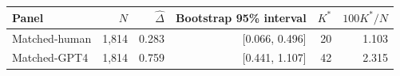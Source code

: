 \begin{tabular}{lrrrrr}
\toprule
Panel & $N$ & $\widehat\Delta$ & Bootstrap 95\% interval & $K^*$ & $100K^*/N$ \\
\midrule
Matched-human & 1,814 & 0.283 & [0.066, 0.496] & 20 & 1.103 \\
Matched-GPT4 & 1,814 & 0.759 & [0.441, 1.107] & 42 & 2.315 \\
\bottomrule
\end{tabular}
